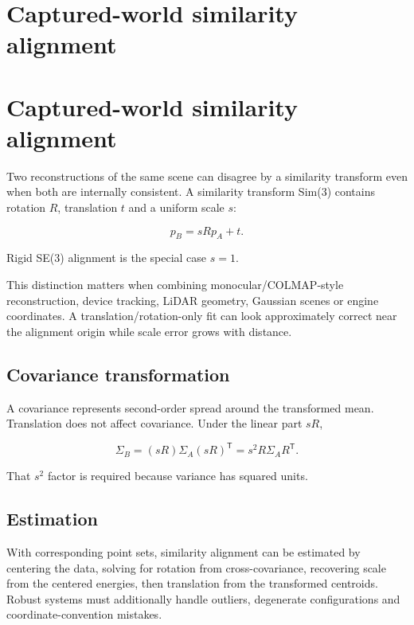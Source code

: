 \hypertarget{appendix-5f40b4fea463}{}
\section*{Captured-world similarity alignment}
\section{Captured-world similarity alignment}\label{appendix-5f40b4fea463-captured-world-similarity-alignment}

Two reconstructions of the same scene can disagree by a similarity transform even when both are internally consistent. A similarity transform Sim(3) contains rotation \(R\), translation \(t\) and a uniform scale \(s\):

\[
p_B = sRp_A+t.
\]

Rigid SE(3) alignment is the special case \(s=1\).

This distinction matters when combining monocular/COLMAP-style reconstruction, device tracking, LiDAR geometry, Gaussian scenes or engine coordinates. A translation/rotation-only fit can look approximately correct near the alignment origin while scale error grows with distance.

\subsection{Covariance transformation}\label{appendix-5f40b4fea463-covariance-transformation}

A covariance represents second-order spread around the transformed mean. Translation does not affect covariance. Under the linear part \(sR\),

\[
\Sigma_B
=
(sR)\Sigma_A(sR)^{\mathsf T}
=
s^2 R\Sigma_A R^{\mathsf T}.
\]

That \(s^2\) factor is required because variance has squared units.

\subsection{Estimation}\label{appendix-5f40b4fea463-estimation}

With corresponding point sets, similarity alignment can be estimated by centering the data, solving for rotation from cross-covariance, recovering scale from the centered energies, then translation from the transformed centroids. Robust systems must additionally handle outliers, degenerate configurations and coordinate-convention mistakes.

